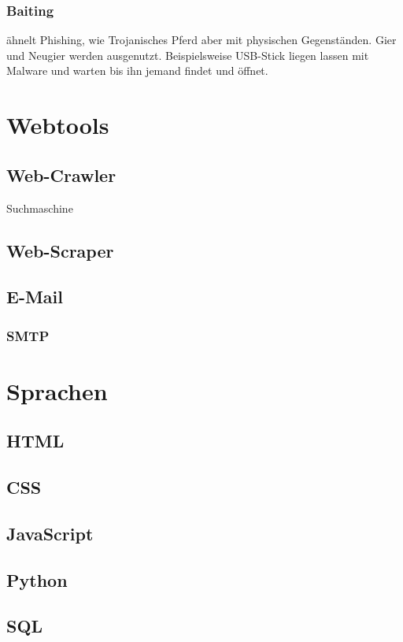 \subsubsection{Baiting}
ähnelt Phishing, wie Trojanisches Pferd aber mit physischen Gegenständen. Gier und Neugier werden ausgenutzt. Beispielsweise USB-Stick liegen lassen mit Malware und warten bis ihn jemand findet und öffnet.


\section{Webtools}
\subsection{Web-Crawler}
Suchmaschine

\subsection{Web-Scraper}

\subsection{E-Mail}
\subsubsection{SMTP}


\section{Sprachen}
\subsection{HTML}

\subsection{CSS}

\subsection{JavaScript}

\subsection{Python}

\subsection{SQL}



